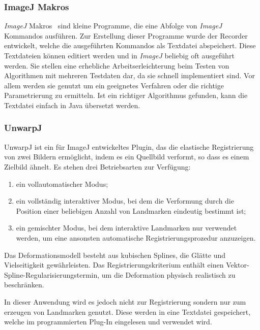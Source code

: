 \subsubsection{ImageJ Makros}	
\textit{ImageJ} Makros~\cite{JMacros} sind kleine Programme, die eine Abfolge von \textit{ImageJ} Kommandos ausführen. Zur Erstellung dieser Programme wurde der Recorder entwickelt, welche die ausgeführten Kommandos als Textdatei abspeichert. Diese Textdateien können editiert werden und in \textit{ImageJ} beliebig oft ausgeführt werden. Sie stellen eine erhebliche Arbeitserleichterung beim Testen von Algorithmen mit mehreren Testdaten dar, da sie schnell implementiert sind. Vor allem werden sie genutzt um ein geeignetes Verfahren oder die richtige Parametrierung zu ermitteln. Ist ein richtiger Algorithmus gefunden, kann die Textdatei einfach in Java übersetzt werden.



\subsubsection{UnwarpJ}

UnwarpJ ist ein für ImageJ entwickeltes Plugin, das die elastische Registrierung von zwei Bildern ermöglicht, indem es ein Quellbild verformt, so dass es einem Zielbild ähnelt. 
Es stehen drei Betriebsarten zur Verfügung: 

\begin{enumerate}
\item ein vollautomatischer Modus; 
\item ein vollständig interaktiver Modus, bei dem die Verformung durch die Position einer beliebigen Anzahl von Landmarken eindeutig bestimmt ist; 
\item ein gemischter Modus, bei dem interaktive Landmarken nur verwendet werden, um eine ansonsten automatische Registrierungsprozedur anzuzeigen.
\end{enumerate}

Das Deformationsmodell besteht aus kubischen Splines, die Glätte und Vielseitigkeit gewährleisten. Das Registrierungskriterium enthält einen Vektor-Spline-Regularisierungstermin, um die Deformation physisch realistisch zu beschränken.\cite{unwrapj}

In dieser Anwendung wird es jedoch nicht zur Registrierung sondern nur zum erzeugen von Landmarken genutzt. Diese werden in eine Textdatei gespeichert, welche im programmierten Plug-In eingelesen und verwendet wird.

